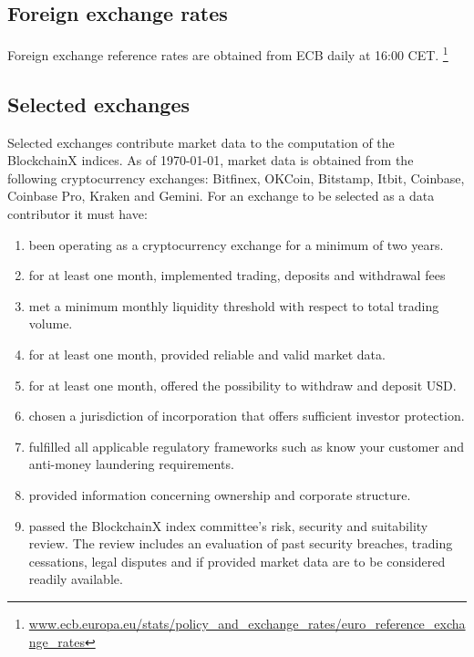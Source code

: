 \documentclass{article}
\begin{document}
\subsection{Foreign exchange rates}
Foreign exchange reference rates are obtained from ECB daily at 16:00 CET. \footnote{\url{www.ecb.europa.eu/stats/policy_and_exchange_rates/euro_reference_exchange_rates}}

\subsection{Selected exchanges}\label{sec:selected-exchanges}
Selected exchanges contribute market data to the computation of the BlockchainX indices. As of \today, market data is obtained from the following cryptocurrency exchanges: 
Bitfinex, OKCoin, Bitstamp, Itbit, Coinbase, Coinbase Pro, Kraken and Gemini.
For an exchange to be selected as a data contributor it must have:

\begin{enumerate}
\item been operating as a cryptocurrency exchange for a minimum of two years.
\item for at least one month, implemented trading, deposits and withdrawal fees
\item met a minimum monthly liquidity threshold with respect to total trading volume.
\item for at least one month, provided reliable and valid market data.

\item for at least one month, offered the possibility to withdraw and deposit USD.
\item chosen a jurisdiction of incorporation that offers sufficient investor protection.
\item fulfilled all applicable regulatory frameworks such as know your customer and anti-money laundering requirements.
\item provided information concerning ownership and corporate structure. 
\item passed the BlockchainX index committee's risk, security and suitability review. The review includes an evaluation of past security breaches, trading cessations, legal disputes and if provided market data are to be considered readily available. 
\end{enumerate}
\end{document}
